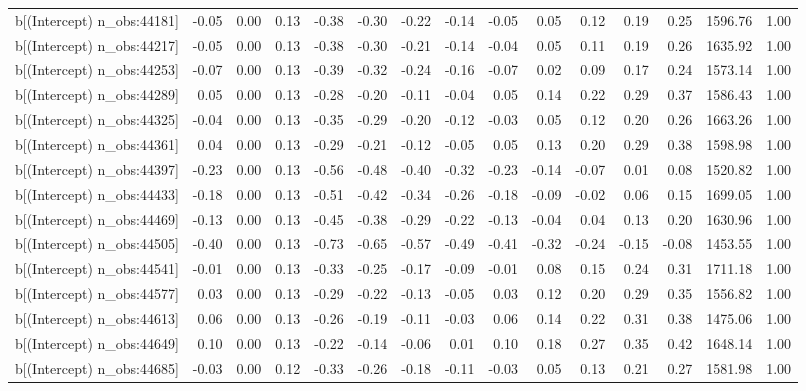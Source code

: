 \begin{table}[ht]
\begin{tabular}{rrrrrrrrrrrrrrr}
  b[(Intercept) n\_obs:44181] & -0.05 & 0.00 & 0.13 & -0.38 & -0.30 & -0.22 & -0.14 & -0.05 & 0.05 & 0.12 & 0.19 & 0.25 & 1596.76 & 1.00 \\ 
  b[(Intercept) n\_obs:44217] & -0.05 & 0.00 & 0.13 & -0.38 & -0.30 & -0.21 & -0.14 & -0.04 & 0.05 & 0.11 & 0.19 & 0.26 & 1635.92 & 1.00 \\ 
  b[(Intercept) n\_obs:44253] & -0.07 & 0.00 & 0.13 & -0.39 & -0.32 & -0.24 & -0.16 & -0.07 & 0.02 & 0.09 & 0.17 & 0.24 & 1573.14 & 1.00 \\ 
  b[(Intercept) n\_obs:44289] & 0.05 & 0.00 & 0.13 & -0.28 & -0.20 & -0.11 & -0.04 & 0.05 & 0.14 & 0.22 & 0.29 & 0.37 & 1586.43 & 1.00 \\ 
  b[(Intercept) n\_obs:44325] & -0.04 & 0.00 & 0.13 & -0.35 & -0.29 & -0.20 & -0.12 & -0.03 & 0.05 & 0.12 & 0.20 & 0.26 & 1663.26 & 1.00 \\ 
  b[(Intercept) n\_obs:44361] & 0.04 & 0.00 & 0.13 & -0.29 & -0.21 & -0.12 & -0.05 & 0.05 & 0.13 & 0.20 & 0.29 & 0.38 & 1598.98 & 1.00 \\ 
  b[(Intercept) n\_obs:44397] & -0.23 & 0.00 & 0.13 & -0.56 & -0.48 & -0.40 & -0.32 & -0.23 & -0.14 & -0.07 & 0.01 & 0.08 & 1520.82 & 1.00 \\ 
  b[(Intercept) n\_obs:44433] & -0.18 & 0.00 & 0.13 & -0.51 & -0.42 & -0.34 & -0.26 & -0.18 & -0.09 & -0.02 & 0.06 & 0.15 & 1699.05 & 1.00 \\ 
  b[(Intercept) n\_obs:44469] & -0.13 & 0.00 & 0.13 & -0.45 & -0.38 & -0.29 & -0.22 & -0.13 & -0.04 & 0.04 & 0.13 & 0.20 & 1630.96 & 1.00 \\ 
  b[(Intercept) n\_obs:44505] & -0.40 & 0.00 & 0.13 & -0.73 & -0.65 & -0.57 & -0.49 & -0.41 & -0.32 & -0.24 & -0.15 & -0.08 & 1453.55 & 1.00 \\ 
  b[(Intercept) n\_obs:44541] & -0.01 & 0.00 & 0.13 & -0.33 & -0.25 & -0.17 & -0.09 & -0.01 & 0.08 & 0.15 & 0.24 & 0.31 & 1711.18 & 1.00 \\ 
  b[(Intercept) n\_obs:44577] & 0.03 & 0.00 & 0.13 & -0.29 & -0.22 & -0.13 & -0.05 & 0.03 & 0.12 & 0.20 & 0.29 & 0.35 & 1556.82 & 1.00 \\ 
  b[(Intercept) n\_obs:44613] & 0.06 & 0.00 & 0.13 & -0.26 & -0.19 & -0.11 & -0.03 & 0.06 & 0.14 & 0.22 & 0.31 & 0.38 & 1475.06 & 1.00 \\ 
  b[(Intercept) n\_obs:44649] & 0.10 & 0.00 & 0.13 & -0.22 & -0.14 & -0.06 & 0.01 & 0.10 & 0.18 & 0.27 & 0.35 & 0.42 & 1648.14 & 1.00 \\ 
  b[(Intercept) n\_obs:44685] & -0.03 & 0.00 & 0.12 & -0.33 & -0.26 & -0.18 & -0.11 & -0.03 & 0.05 & 0.13 & 0.21 & 0.27 & 1581.98 & 1.00 \\ 

\end{tabular}
\end{table}

